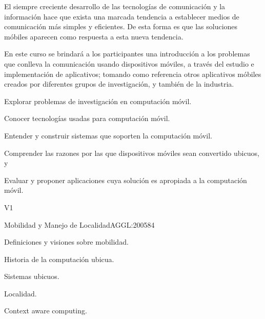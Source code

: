 \begin{syllabus}


\begin{justification}
El siempre creciente desarrollo de las tecnologías de comunicación y la
información hace que exista una marcada tendencia a  establecer medios de 
comunicación más simples y eficientes. De esta forma es que las soluciones
móbiles aparecen como respuesta a esta nueva tendencia.

En este curso se brindará a los participantes una introducción a los
problemas que conlleva la comunicación usando dispositivos móviles, a través del
estudio e implementación de aplicativos; tomando como referencia otros aplicativos
móbiles creados por diferentes grupos de investigación, y también de la industria.

\end{justification}

\begin{goals}
      \item Explorar problemas de investigación en computación móvil.
      \item Conocer tecnologías usadas para computación móvil.
      \item Entender y construir sistemas que soporten la computación móvil.
      \item Comprender las razones por las que dispositivos móviles sean convertido ubicuos, y
      \item Evaluar y proponer aplicaciones cuya solución es apropiada a la computación móvil.

\end{goals}

\begin{outcomes}{V1}
\end{outcomes}

\begin{unit}{Mobilidad y Manejo de Localidad}{AGGL:2005}{8}{4}
   \begin{topics}
     \item Definiciones y visiones sobre mobilidad.
     \item Historia de la computación ubicua.
     \item Sistemas ubicuos.
     \item Localidad.
     \item Context aware computing.
   \end{topics}


\end{unit}
\end{syllabus}
